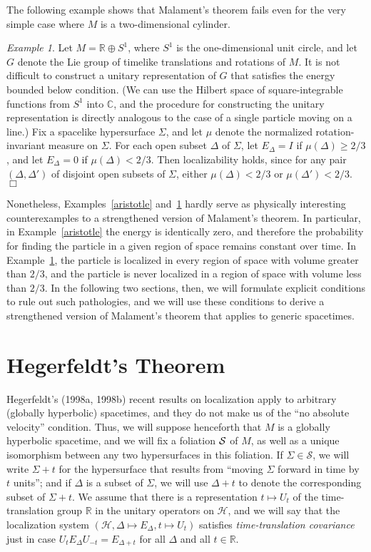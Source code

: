 \documentclass[12pt]{article}
\theoremstyle{remark}
\newtheorem{example}{Example}
\newcommand{\hil}[1]{\mathcal{#1}}
\begin{document}
The following example shows that Malament's theorem fails even for the
very simple case where $M$ is a two-dimensional cylinder.
\begin{example}  \label{cylinder} Let $M=\mathbb{R}\oplus S^{1}$, where $S^{1}$ is the
  one-dimensional unit circle, and let $G$ denote the Lie group of
  timelike translations and rotations of $M$.  It is not difficult to
  construct a unitary representation of $G$ that satisfies the energy
  bounded below condition.  (We can use the Hilbert space of
  square-integrable functions from $S^{1}$ into $\mathbb{C}$, and the
  procedure for constructing the unitary representation is directly
  analogous to the case of a single particle moving on a line.)  Fix a
  spacelike hypersurface $\Sigma$, and let $\mu$ denote the normalized
  rotation-invariant measure on $\Sigma$.  For each open subset
  $\Delta$ of $\Sigma$, let $E_{\Delta}=I$ if $\mu (\Delta )\geq 2/3$,
  and let $E_{\Delta}=0$ if $\mu (\Delta )<2/3$.  Then localizability
  holds, since for any pair $(\Delta ,\Delta ')$ of disjoint open
  subsets of $\Sigma$, either $\mu (\Delta )<2/3$ or $\mu (\Delta
  ')<2/3$.  \hfill $\Box$
\end{example}

Nonetheless, Examples~\ref{aristotle} and~\ref{cylinder} hardly serve
as physically interesting counterexamples to a strengthened version of
Malament's theorem.  In particular, in Example~\ref{aristotle} the
energy is identically zero, and therefore the probability for finding
the particle in a given region of space remains constant over time.
In Example~\ref{cylinder}, the particle is localized in every region
of space with volume greater than $2/3$, and the particle is never
localized in a region of space with volume less than $2/3$.  In the
following two sections, then, we will formulate explicit conditions to
rule out such pathologies, and we will use these conditions to derive
a strengthened version of Malament's theorem that applies to generic
spacetimes.

\section{Hegerfeldt's Theorem}
Hegerfeldt's (1998a, 1998b) recent results on localization apply to
arbitrary (globally hyperbolic) spacetimes, and they do not make us of
the ``no absolute velocity'' condition.  Thus, we will suppose
henceforth that $M$ is a globally hyperbolic spacetime, and we will
fix a foliation $\cal{S}$ of $M$, as well as a unique isomorphism
between any two hypersurfaces in this foliation.  If $\Sigma \in
\mathcal{S}$, we will write $\Sigma +t$ for the hypersurface that
results from ``moving $\Sigma$ forward in time by $t$ units''; and if
$\Delta$ is a subset of $\Sigma$, we will use $\Delta +t$ to denote
the corresponding subset of $\Sigma +t$.  We assume that there is a
representation $t\mapsto U_{t}$ of the time-translation group
$\mathbb{R}$ in the unitary operators on $\hil{H}$, and we will say
that the localization system $(\hil{H},\Delta \mapsto
E_{\Delta},t\mapsto U_{t})$ satisfies \emph{time-translation
  covariance} just in case $U_{t}E_{\Delta}U_{-t}=E_{\Delta +t}$ for
all $\Delta$ and all $t\in \mathbb{R}$.
\end{document}
